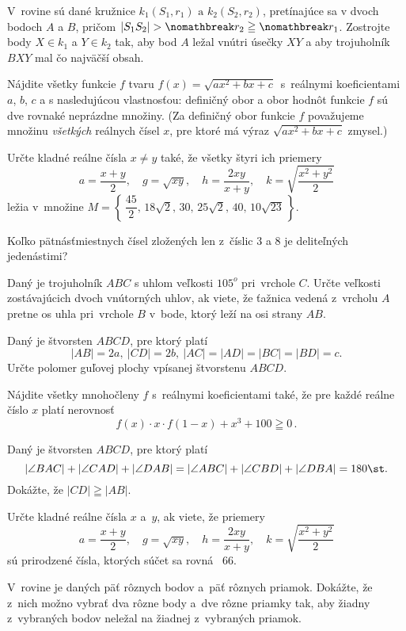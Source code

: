 {%
V~rovine sú dané kružnice
$k_1(S_1,r_1) \text{\ a\ } k_2(S_2,r_2)$, pretínajúce sa v dvoch bodoch
$A$ a $B$, pričom
$ |S_1S_2|> \nomathbreak r_2\geqq \nomathbreak r_1$.
Zostrojte body $X\in k_1$ a
$Y\in k_2$ tak, aby bod $A$ ležal vnútri úsečky $XY$
a aby trojuholník $BXY$ mal čo najväčší obsah.
}

{%
Nájdite všetky funkcie $f$ tvaru $f(x)=\sqrt{ax^2+bx+c}\,$
s~reálnymi koeficientami $a$, $b$, $c$ a s nasledujúcou vlastnosťou:
definičný obor a obor hodnôt funkcie $f$ sú dve rovnaké neprázdne
množiny. (Za definičný obor funkcie $f$ považujeme množinu {\it všetkých\/} reálnych čísel $x$, pre ktoré má výraz $\sqrt{ax^2+bx+c}$
zmysel.)
}

{%
Určte kladné reálne čísla $x\ne y$ také, že všetky štyri
ich priemery
$$
a=\frac{x+y}2,\quad g=\sqrt{xy},\quad h=\frac{2xy}{x+y},\quad
k=\sqrt{\frac{x^2+y^2}2}
$$
ležia v~množine $M=\left\{\,\dfrac{45}2,\,18\sqrt2,\,30,\,
25\sqrt2,\,40,\,10\sqrt{23}\,\right\}$.
}

{%
Koľko pätnásťmiestnych čísel zložených len z~číslic $3$ a $8$
je deliteľných jedenástimi?
}

{%
Daný je trojuholník $ABC$ s uhlom  veľkosti
$105^o$  pri~vrchole $C$. Určte
veľkosti  zostávajúcich dvoch vnútorných uhlov, ak viete, že ťažnica
vedená z~vrcholu $A$ pretne os uhla pri~vrchole $B$ v~bode, ktorý leží
na osi strany $AB$.
}

{%
Daný je štvorsten $ABCD$, pre ktorý platí
$$
|AB|=2a,\ |CD|=2b,\ |AC|=|AD|=|BC|=|BD|=c .
$$
Určte polomer guľovej plochy vpísanej štvorstenu $ABCD$.
}

{%
Nájdite všetky mnohočleny $f$ s~reálnymi koeficientami
také, že pre každé reálne číslo $x$  platí nerovnosť
$$
f(x)\cdot x\cdot f(1-x)+x^3+100\geqq 0\,.
$$
}

{%
Daný je štvorsten $ABCD$, pre ktorý platí
$$
|\angle BAC|+|\angle CAD|+|\angle DAB|=
|\angle ABC|+|\angle CBD|+|\angle DBA|= 180{\st}.
$$
Dokážte, že $|CD|\geqq|AB|$.
}

{%
Určte kladné reálne čísla $x$ a~$y$, ak viete, že priemery
$$
a=\frac{x+y}2,\quad g=\sqrt{xy},\quad h=\frac{2xy}{x+y},\quad
k=\sqrt{\frac{x^2+y^2}2}
$$
sú prirodzené čísla, ktorých súčet sa rovná~ 66.
}

{%
V~rovine je daných päť rôznych bodov a~päť rôznych priamok. Dokážte,
že z~nich možno vybrať dva rôzne body a~dve rôzne priamky tak, aby
žiadny z~vybraných bodov neležal na žiadnej z~vybraných
priamok.
}


